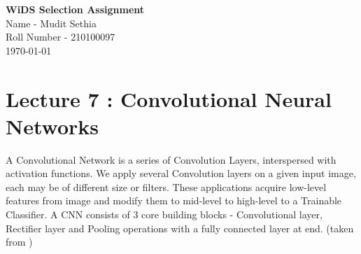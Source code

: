 \documentclass[12pt,a4paper]{article}
\begin{document}
\setlength{\parindent}{0cm}
\begin{center}
{\textbf {\huge WiDS Selection Assignment}}\\[5mm]
{\large Name - Mudit Sethia \\ \vspace{0.5 ex} Roll Number - 210100097} \\[5mm]
\today\\[5mm] %
\end{center}


\section{Lecture 7 : Convolutional Neural Networks}
A Convolutional Network is a series of Convolution Layers, interspersed with activation functions. We apply several Convolution layers on a given input image, each may be of different size or filters. These applications acquire low-level features from image and modify them to mid-level to high-level to a Trainable Classifier. A CNN consists of 3 core building blocks - Convolutional layer, Rectifier layer and Pooling operations with a fully connected layer at end. (taken from \textcite{CS231n})
\end{document}
